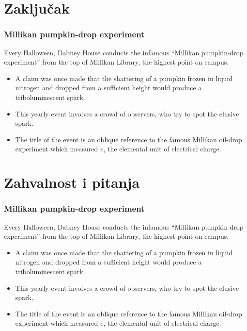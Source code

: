 \documentclass[hyperref={bookmarks=false},aspectratio=169]{beamer}
\begin{document}
\section{Zaključak}

\begin{frame}
\frametitle{Millikan pumpkin-drop experiment}
Every Halloween, Dabney House conducts the infamous ``Millikan pumpkin-drop experiment'' from the top of Millikan Library, the highest point on campus.

\begin{itemize}
    \item A claim was once made that the shattering of a pumpkin frozen in liquid nitrogen and dropped from a sufficient height would produce a triboluminescent spark. 
    \item This yearly event involves a crowd of observers, who try to spot the elusive spark.
    \item The title of the event is an oblique reference to the famous Millikan oil-drop experiment which measured $e$, the elemental unit of electrical charge.
\end{itemize}

\end{frame}

\section{Zahvalnost i pitanja}

\begin{frame}
\frametitle{Millikan pumpkin-drop experiment}
Every Halloween, Dabney House conducts the infamous ``Millikan pumpkin-drop experiment'' from the top of Millikan Library, the highest point on campus.

\begin{itemize}
    \item A claim was once made that the shattering of a pumpkin frozen in liquid nitrogen and dropped from a sufficient height would produce a triboluminescent spark. 
    \item This yearly event involves a crowd of observers, who try to spot the elusive spark.
    \item The title of the event is an oblique reference to the famous Millikan oil-drop experiment which measured $e$, the elemental unit of electrical charge.
\end{itemize}

\end{frame}
\end{document}
